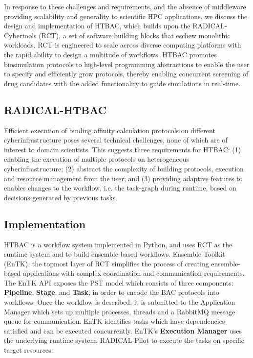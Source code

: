 	In response to these challenges and requirements, and the absence of middleware
providing scalability and generality to scientific HPC applications, we discuss the
design and implementation of HTBAC, which builds upon the RADICAL-Cybertools (RCT), 
a set of software building blocks that eschew monolithic workloads. RCT is
engineered to scale across diverse computing platforms with the rapid ability to 
design a multitude of workflows. HTBAC promotes biosimulation protocols to 
high-level programming abstractions to enable the user to specify and efficiently 
grow protocols, thereby enabling concurrent screening of drug candidates with the
added functionality to guide simulations in real-time. 

\subsection{RADICAL-HTBAC}

	Efficient execution of binding affinity calculation protocols on different 
cyberinfrastructure poses several technical challenges, none of which 
are of interest to domain scientists. This suggests three requirements for HTBAC\@: 
(1) enabling the execution of multiple protocols on heterogeneous cyberinfrastructure; 
(2) abstract the complexity of building protocols, execution and resource management 
from the user; and (3) providing adaptive features to enables changes to the workflow,
i.e. the task-graph during runtime, based on decisions generated by previous tasks. 

\subsection{Implementation}

	HTBAC is a workflow system implemented in Python, and uses RCT as the runtime 
system and to build ensemble-based workflows. Ensemble Toolkit (EnTK), the 
topmost layer of RCT simplifies the process of creating ensemble-based applications 
with complex coordination and communication requirements. The EnTK API exposes 
the PST model which consists of three components: \textbf{Pipeline}, \textbf{Stage}, 
and \textbf{Task}, in order to encode the BAC protocols into workflows. Once the 
workflow is described, it is submitted to the \b{Application Manager} which sets 
up multiple processes, threads and a RabbitMQ message queue for communication. 
EnTK identifies tasks which have dependencies satisfied and can be executed 
concurrently. EnTK's \textbf{Execution Manager} uses the underlying runtime system, 
RADICAL-Pilot to execute the tasks on specific target resources. 

